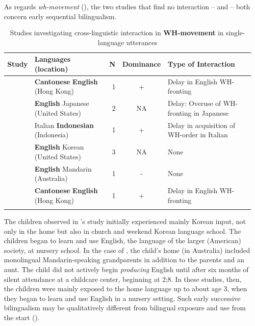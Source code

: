 \documentclass[output=paper]{langscibook}
\begin{document}
As regards \textit{wh-movement} (), the two studies that find no interaction – \citet{Park-Johnson2017} and \citet{QidiBiase2020} – both concern early sequential bilingualism.

\begin{table}
\begin{tabularx}{\textwidth}{QQ@{}rcQ}\lsptoprule
{ Study} & { Languages} { (location)} & { N}  & { Dominance} & { Type of Interaction}\\
\midrule
\citet{YipMatthews2000} & \textbf{Cantonese} \textbf{English} (Hong Kong) & 1 & + & Delay in English WH-fronting \\
\tablevspace
\citet{Mishina-mori2005} & \textbf{English} Japanese (United States) & 2 & NA & Delay: Overuse of WH-fronting in Japanese\\
\tablevspace
\citet{Soriente2007} & Italian \textbf{Indonesian} (Indonesia) & 1 & + & Delay in acquisition of WH-order in Italian\\
\tablevspace
\citet{Park-Johnson2017} & \textbf{English} Korean (United States) & 3 & NA & None\\
\tablevspace
\citet{QidiBiase2020} & \textbf{English} Mandarin (Australia) & 1 & - & None\\
\tablevspace
\citet{YipMatthews2000} & \textbf{Cantonese} \textbf{English} (Hong Kong) & 1 & + & Delay in English WH-fronting \\
\lspbottomrule
\end{tabularx}
\caption{Studies investigating cross-linguistic interaction in \textbf{WH-movement} in single-language utterances}
\label{tab:vihmannvihmann:4}
\end{table}

The children observed in \citeauthor{Park-Johnson2017}’s study initially experienced mainly Korean input, not only in the home but also in church and weekend Korean language school. The children began to learn and use English, the language of the larger (American) society, at nursery school. In the case of \citeauthor{QidiBiase2020}, the child’s home (in Australia) included monolingual Mandarin-speaking grandparents in addition to the parents and an aunt. The child did not actively begin \textit{producing} English until after six months of silent attendance at a childcare center, beginning at 2;8. In these studies, then, the children were mainly exposed to the home language up to about age 3, when they began to learn and use English in a nursery setting. Such early successive bilingualism may be qualitatively different from bilingual exposure and use from the start (\citealt{Vihman1982}).
\end{document}
